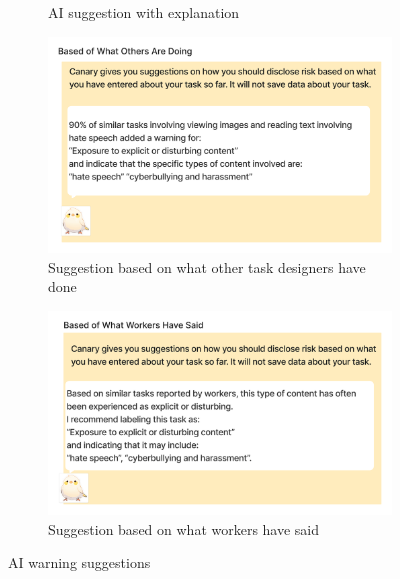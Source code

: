 \begin{figure}[htbp]
\begin{subfigure}[b]{0.48\textwidth}
        \caption{AI suggestion with explanation}
        \label{fig:AI-explanation}
    \end{subfigure}
    \vspace{1em} %
    \begin{subfigure}[b]{0.48\textwidth}
        \centering
        \includegraphics[width=\textwidth]{figures/study-probes/AI-probes/AI-task-designers.pdf}
        \caption{Suggestion based on what other task designers have done}
        \label{fig:AI-based-on-others}
    \end{subfigure}
    \hfill
    \begin{subfigure}[b]{0.48\textwidth}
        \centering
        \includegraphics[width=\textwidth]{figures/study-probes/AI-probes/AI-workers.pdf} 
        \caption{Suggestion based on what workers have said}
        \label{AI-based-on-workers}
    \end{subfigure}
    \caption{AI warning suggestions}
    \label{fig:task-designer-AI}
\end{figure}

